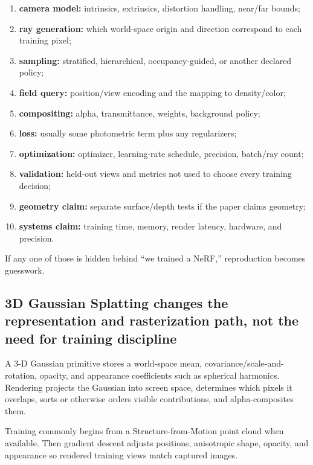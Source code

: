 \begin{enumerate}
\def\labelenumi{\arabic{enumi}.}
\tightlist
\item
  \textbf{camera model:} intrinsics, extrinsics, distortion handling, near/far bounds;
\item
  \textbf{ray generation:} which world-space origin and direction correspond to each training pixel;
\item
  \textbf{sampling:} stratified, hierarchical, occupancy-guided, or another declared policy;
\item
  \textbf{field query:} position/view encoding and the mapping to density/color;
\item
  \textbf{compositing:} alpha, transmittance, weights, background policy;
\item
  \textbf{loss:} usually some photometric term plus any regularizers;
\item
  \textbf{optimization:} optimizer, learning-rate schedule, precision, batch/ray count;
\item
  \textbf{validation:} held-out views and metrics not used to choose every training decision;
\item
  \textbf{geometry claim:} separate surface/depth tests if the paper claims geometry;
\item
  \textbf{systems claim:} training time, memory, render latency, hardware, and precision.
\end{enumerate}

If any one of those is hidden behind ``we trained a NeRF,'' reproduction becomes guesswork.

\subsection{3D Gaussian Splatting changes the representation and rasterization path, not the need for training discipline}\label{04-visual-computing-ii-ch035-d-gaussian-splatting-changes-the-representation-and-rasterization-path-not-the-need-for-training-discipline}

A 3-D Gaussian primitive stores a world-space mean, covariance/scale-and-rotation, opacity, and appearance coefficients such as spherical harmonics. Rendering projects the Gaussian into screen space, determines which pixels it overlaps, sorts or otherwise orders visible contributions, and alpha-composites them.

Training commonly begins from a Structure-from-Motion point cloud when available. Then gradient descent adjusts positions, anisotropic shape, opacity, and appearance so rendered training views match captured images.

